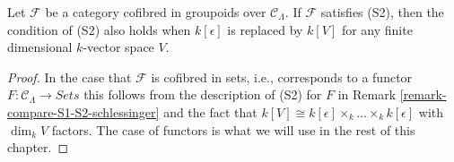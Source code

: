 \begin{lemma}
\label{lemma-S2-extensions}
Let $\mathcal{F}$ be a category cofibred in groupoids over
$\mathcal{C}_\Lambda$. If $\mathcal{F}$ satisfies (S2), then the
condition of (S2) also holds when $k[\epsilon]$ is replaced by $k[V]$
for any finite dimensional $k$-vector space $V$.
\end{lemma}

\begin{proof}
In the case that $\mathcal{F}$ is cofibred in sets, i.e., corresponds
to a functor $F : \mathcal{C}_\Lambda \to \textit{Sets}$ this follows
from the description of (S2) for $F$ in
Remark \ref{remark-compare-S1-S2-schlessinger}
and the fact that
$k[V] \cong k[\epsilon] \times_k \ldots \times_k k[\epsilon]$
with $\dim_k V$ factors. The case of functors is what we will use in
the rest of this chapter.


\end{proof}

